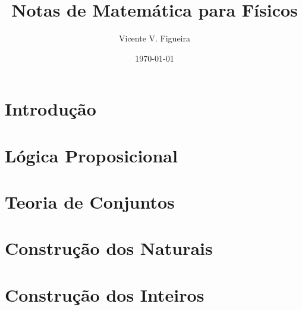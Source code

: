 \documentclass[twoside]{amsart}
\title{
Notas de Matemática para Físicos
}
\author{
  Vicente V. Figueira
       }
\date{\today}
\numberwithin{equation}{section}
\begin{document}
\maketitle

\tableofcontents


\section{Introdução}



\section{Lógica Proposicional}



\section{Teoria de Conjuntos}



\section{Construção dos Naturais}



\section{Construção dos Inteiros}
\end{document}
